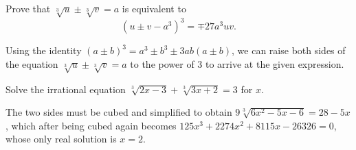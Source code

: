 \documentclass[12pt,a4paper]{memoir}
\theoremstyle{definition}
\begin{document}
\begin{tcolorbox}[title={Rationalizing Irrational Equations of the Form $\sqrt[3]{u} \pm \sqrt[3]{v} = a$}]
	\begin{question}
		Prove that $\sqrt[3]{u} \pm \sqrt[3]{v} = a$ is equivalent to $$(u\pm v - a^3)^3 = \mp 27a^3uv.$$
	\end{question}
	
	\begin{solution}
		Using the identity $(a\pm b)^3 = a^3 \pm b^3 \pm 3ab(a\pm b)$, we can raise both sides of the equation $\sqrt[3]{u} \pm \sqrt[3]{v} = a$ to the power of $3$ to arrive at the given expression.
	\end{solution}
	
	\begin{question}
		Solve the irrational equation $\sqrt[3]{2x-3}+\sqrt[3]{3x+2}=3$ for $x$.
	\end{question}
	
	\begin{solution}
		The two sides must be cubed and simplified to obtain $9\sqrt[3]{6x^2-5x-6}=28-5x$, which after being cubed again becomes $125x^3+2274x^2+8115x-26326=0$, whose only real solution is $x=2$.
	\end{solution}
\end{tcolorbox}
\end{document}
